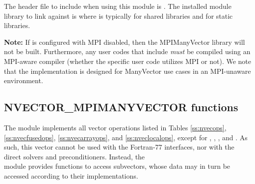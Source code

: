 The header file to include when using this module is
. The installed module library to link against is
 where  is typically
 for shared libraries and  for static libraries.

\warn\textbf{Note:} If {\sundials} is configured with MPI disabled, then the
MPIManyVector library will not be built.  Furthermore, any user codes
that include  \emph{must} be compiled
using an MPI-aware compiler (whether the specific user code utilizes
MPI or not).  We note that the {\nvecmanyvector} implementation is
designed for ManyVector use cases in an MPI-unaware environment.


\subsection{NVECTOR\_MPIMANYVECTOR functions}
\label{ss:nvec_mpimanyvector_functions}

The {\nvecmpimanyvector} module implements all vector operations listed
in Tables \ref{ss:nvecops}, \ref{ss:nvecfusedops}, \ref{ss:nvecarrayops},
and \ref{ss:nveclocalops}, except for ,
, , and
.  As such, this vector cannot be
used with the {\sundials} Fortran-77 interfaces, nor with the
{\sundials} direct solvers and preconditioners. Instead, the \\
{\nvecmpimanyvector} module provides functions to access subvectors,
whose data may in turn be accessed according to their {\nvector}
implementations.

